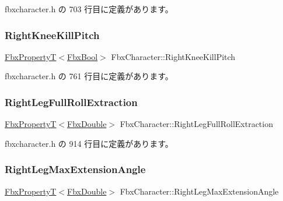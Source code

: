  fbxcharacter.\+h の 703 行目に定義があります。

\mbox{\label{class_fbx_character_ac52d41bf76dd4a9cddf41e7bf465590d}} 
\subsubsection{\texorpdfstring{Right\+Knee\+Kill\+Pitch}{RightKneeKillPitch}}
{\footnotesize\ttfamily \hyperlink{class_fbx_property_t}{Fbx\+PropertyT}$<$\hyperlink{fbxtypes_8h_a92e0562b2fe33e76a242f498b362262e}{Fbx\+Bool}$>$ Fbx\+Character\+::\+Right\+Knee\+Kill\+Pitch}



 fbxcharacter.\+h の 761 行目に定義があります。

\mbox{\label{class_fbx_character_aefa979f235675c3dff6d25d2d32716e5}} 
\subsubsection{\texorpdfstring{Right\+Leg\+Full\+Roll\+Extraction}{RightLegFullRollExtraction}}
{\footnotesize\ttfamily \hyperlink{class_fbx_property_t}{Fbx\+PropertyT}$<$\hyperlink{fbxtypes_8h_a171e72a1c46fc15c1a6c9c31948c1c5b}{Fbx\+Double}$>$ Fbx\+Character\+::\+Right\+Leg\+Full\+Roll\+Extraction}



 fbxcharacter.\+h の 914 行目に定義があります。

\mbox{\label{class_fbx_character_a2eff6ef0125312f9ef47652ae70d03e9}} 
\subsubsection{\texorpdfstring{Right\+Leg\+Max\+Extension\+Angle}{RightLegMaxExtensionAngle}}
{\footnotesize\ttfamily \hyperlink{class_fbx_property_t}{Fbx\+PropertyT}$<$\hyperlink{fbxtypes_8h_a171e72a1c46fc15c1a6c9c31948c1c5b}{Fbx\+Double}$>$ Fbx\+Character\+::\+Right\+Leg\+Max\+Extension\+Angle}




